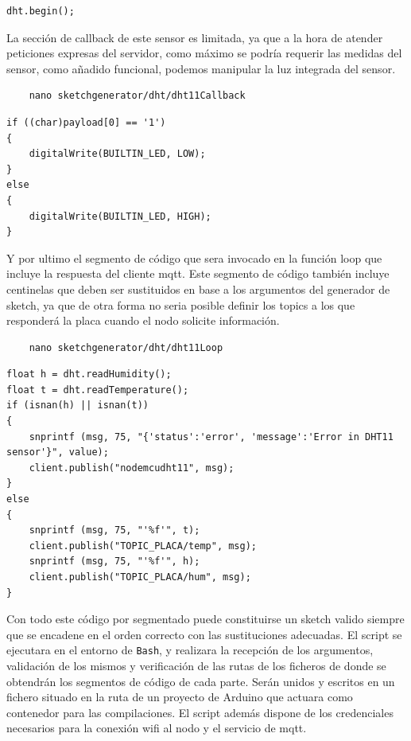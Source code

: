 \begin{verbatim}
dht.begin();
\end{verbatim}

La sección de callback de este sensor es limitada, ya que a la hora de atender peticiones expresas del servidor, como máximo se podría requerir las medidas del sensor, como añadido funcional, podemos manipular la luz integrada del sensor.

\begin{verbatim}
    nano sketchgenerator/dht/dht11Callback
\end{verbatim}

\begin{verbatim}
if ((char)payload[0] == '1')
{
    digitalWrite(BUILTIN_LED, LOW);
}
else
{
    digitalWrite(BUILTIN_LED, HIGH);
}
\end{verbatim}

Y por ultimo el segmento de código que sera invocado en la función loop que incluye la respuesta del cliente \gls{mqtt}. Este segmento de código también incluye centinelas que deben ser sustituidos en base a los argumentos del generador de \gls{sketch}, ya que de otra forma no seria posible definir los topics a los que responderá la placa cuando el nodo solicite información.
\begin{verbatim}
    nano sketchgenerator/dht/dht11Loop
\end{verbatim}

\begin{verbatim}
float h = dht.readHumidity();
float t = dht.readTemperature();
if (isnan(h) || isnan(t))
{
    snprintf (msg, 75, "{'status':'error', 'message':'Error in DHT11 sensor'}", value);
    client.publish("nodemcudht11", msg);
}
else
{
    snprintf (msg, 75, "'%f'", t);
    client.publish("TOPIC_PLACA/temp", msg);
    snprintf (msg, 75, "'%f'", h);
    client.publish("TOPIC_PLACA/hum", msg);
}
\end{verbatim}

Con todo este código por segmentado puede constituirse un \gls{sketch} valido siempre que se encadene en el orden correcto con las sustituciones adecuadas. El script se ejecutara en el entorno de \verb|Bash|, y realizara la recepción de los argumentos, validación de los mismos y verificación de las rutas de los ficheros de donde se obtendrán los segmentos de código de cada parte. Serán unidos y escritos en un fichero situado en la ruta de un proyecto de Arduino que actuara como contenedor para las compilaciones. El script además dispone de los credenciales necesarios para la conexión \gls{wifi} al nodo y el servicio de \gls{mqtt}.

